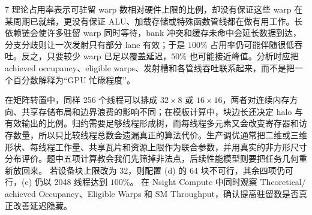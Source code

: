 \begin{solutionexercise}{7}
理论占用率表示可驻留 warp 数相对硬件上限的比例，却没有保证这些 warp 在某周期已就绪，更没有保证 ALU、加载存储或特殊函数管线都在做有用工作。长依赖链会使许多驻留 warp 同时等待，bank 冲突和缓存未命中会延长数据到达，分支分歧则让一次发射只有部分 lane 有效；于是 $100\%$ 占用率仍可能伴随很低吞吐。反之，只要较少 warp 已足以覆盖延迟，$50\%$ 也可能接近峰值。分析时应把 achieved occupancy、eligible warps、发射槽和各管线吞吐联系起来，而不是把一个百分数解释为“GPU 忙碌程度”。

在矩阵转置中，同样 256 个线程可以排成 $32\times8$ 或 $16\times16$，两者对连续内存方向、共享存储布局和边界浪费的影响不同；在模板计算中，块边长还决定 halo 与有效输出的比例。归约需要足够线程形成树，而每线程多元素又会改变寄存器和访存数量，所以只比较线程总数会遗漏真正的算法代价。生产调优通常把二维或三维形状、每线程工作量、共享瓦片和资源上限作为联合参数，并用真实的非方形尺寸分布评价。题中五项计算教会我们先筛掉非法点，后续性能模型则要把任务几何重新放回来。
\variantheading 若设备块上限改为 32，则配置 (d) 的 64 块不可行，其余四项仍可行，(e) 仍以 2048 线程达到 $100\%$。
\practiceheading 在 Nsight Compute 中同时观察 Theoretical/ achieved Occupancy、Eligible Warps 和 SM Throughput，确认提高驻留数是否真正改善延迟隐藏。
\end{solutionexercise}

